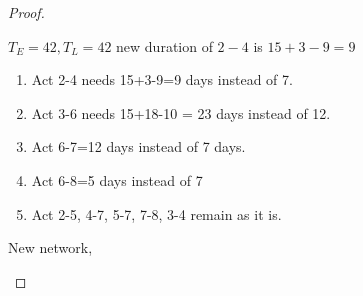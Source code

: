 \documentclass[oneside,11pt,pdftex]{book}%
\numberwithin{equation}{section}
\numberwithin{section}{chapter}
\numberwithin{equation}{chapter}
\begin{document}
\begin{proof}
\begin{center}
\begin{tikzpicture}[x=0.75pt,y=0.75pt,yscale=-1,xscale=1]
			
		\end{tikzpicture}
		
	\end{center}
$ T_E=42,T_L=42 $ new duration of $ 2-4 $ is $ 15+3-9=9 $
\begin{enumerate}
	\item Act 2-4 needs 15+3-9=9 days instead of 7.
	\item Act 3-6 needs 15+18-10 = 23 days instead of 12.
	\item Act 6-7=12 days instead of 7 days.
	\item Act 6-8=5 days instead of 7
	\item Act 2-5, 4-7, 5-7, 7-8, 3-4 remain as it is.
	
\end{enumerate}
New network,
\begin{center}
	
	
	
	\begin{tikzpicture}[x=0.75pt,y=0.75pt,yscale=-1,xscale=1]
		

\end{tikzpicture}
\end{center}
\end{proof}
\end{document}

